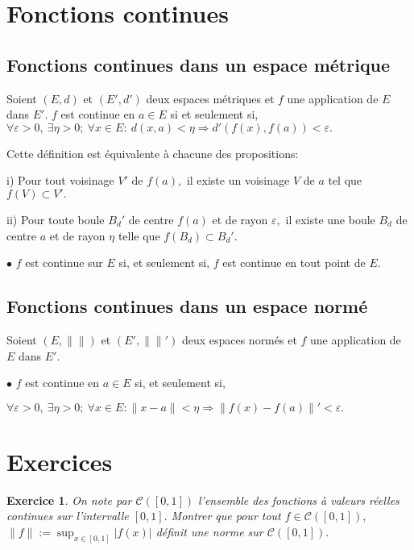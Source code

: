 \documentclass[11pt,a4paper]{report}
\newtheorem{exo}{Exercice}[section]
\begin{document}
\section{Fonctions continues}

\subsection{Fonctions continues dans un espace métrique}

Soient $(E,d)$ et $(E',d')$ deux espaces métriques et $f$ une application de $E$ dans $E'$. $f$ est continue en $a\in E$ si et seulement si,
$\forall\varepsilon>0,\:\exists\eta>0;\:\forall x\in E:\:d(x,a)<\eta\Rightarrow d'(f(x),f(a))<\varepsilon.$

Cette définition est équivalente à chacune des propositions:

i) Pour tout voisinage $V'$ de $f(a),$ il existe un voisinage $V$ de $a$ tel que $f(V)\subset V'.$

ii) Pour toute boule $B_d'$ de centre $f(a)$ et de rayon $\varepsilon,$ il existe une boule $B_d$ de centre $a$ et de rayon $\eta$ telle que $f(B_d)\subset B_d'.$

$\bullet$ $f$ est continue sur $E$ si, et seulement si, $f$ est continue en tout point de $E.$

\subsection{Fonctions continues dans un espace normé}

Soient $(E,\|\|)$ et $(E',\|\|')$ deux espaces normés et $f$ une application de $E$ dans $E'.$

$\bullet$ $f$ est continue en $a\in E$ si, et seulement si,

$\forall\varepsilon>0,\:\exists\eta>0;\:\forall x\in E:\|x-a\|<\eta\Rightarrow \|f(x)-f(a)\|'<\varepsilon.$

\section{Exercices}


\begin{exo}
On note par $\mathcal{C}([0,1])$ l'ensemble des fonctions à valeurs réelles continues sur l'intervalle $[0,1].$ Montrer que pour tout $f\in \mathcal{C}([0,1]),$ $\|f\|:=\sup_{x\in [0,1]}|f(x)|$ définit une norme sur $\mathcal{C}([0,1]).$
\end{exo}
\end{document}
